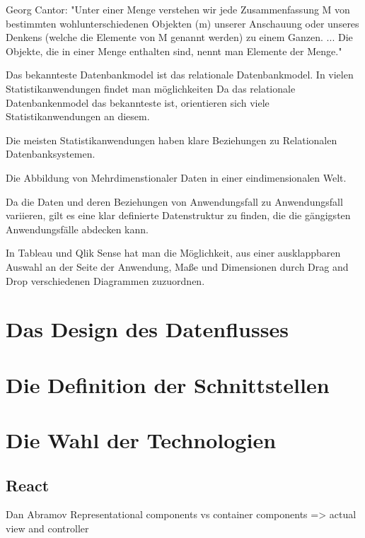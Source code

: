 Georg Cantor: "Unter einer Menge verstehen wir jede Zusammenfassung M von bestimmten wohlunterschiedenen
Objekten (m) unserer Anschauung oder unseres Denkens (welche die Elemente von M genannt werden) zu einem Ganzen.
... Die Objekte, die in einer Menge enthalten sind, nennt man Elemente der Menge."

Das bekannteste Datenbankmodel ist das relationale Datenbankmodel. In vielen Statistikanwendungen findet
man möglichkeiten
Da das relationale Datenbankenmodel das bekannteste ist, orientieren sich viele Statistikanwendungen an diesem.

Die meisten Statistikanwendungen haben klare Beziehungen zu Relationalen Datenbanksystemen. 

Die Abbildung von Mehrdimenstionaler Daten in einer eindimensionalen Welt.




Da die Daten und deren Beziehungen von Anwendungsfall zu Anwendungsfall
variieren, gilt es eine klar definierte Datenstruktur zu finden, die
die gängigsten Anwendungsfälle abdecken kann. 




In Tableau und Qlik Sense hat man die Möglichkeit, aus einer ausklappbaren Auswahl an der Seite der
Anwendung, Maße und Dimensionen durch Drag and Drop verschiedenen Diagrammen zuzuordnen. 

\section{Das Design des Datenflusses}
\label{sec:das-design-des-datenflusses}

\section{Die Definition der Schnittstellen}
\label{sec:die-definition-der-schnittstellen}

\section{Die Wahl der Technologien}

\subsection{React}
Dan Abramov Representational components vs container components => actual view and controller


